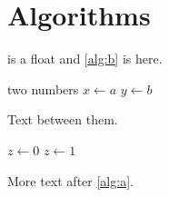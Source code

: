 \documentclass{article}
\begin{document}
\section{Algorithms}
 is a float and \cref{alg:b} is here.
\begin{algorithm}
\caption{Euclid}\label{alg:a}
\begin{algorithmic}[1]
\Require two numbers
\State $x \gets a$
\Statex
\State $y \gets b$
\end{algorithmic}
\label{alg:after}
\end{algorithm}
Text between them.\label{text:1}

\begin{algorithm}[H]
\caption{Two}\label{alg:b}
\begin{algorithmic}
\State $z \gets 0$
\State $z \gets 1$
\EndIf
\end{algorithmic}
\end{algorithm}
More text after \cref{alg:a}.\label{text:2}
\end{document}

